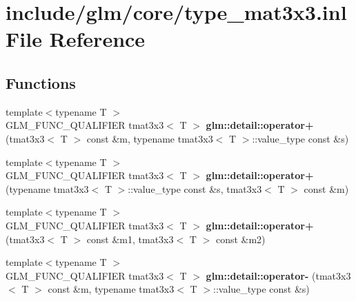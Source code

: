 \hypertarget{type__mat3x3_8inl}{\section{include/glm/core/type\-\_\-mat3x3.inl \-File \-Reference}
\label{type__mat3x3_8inl}
}
\subsection*{\-Functions}
\begin{DoxyCompactItemize}
\item 
\hypertarget{namespaceglm_1_1detail_a57257ebf7c5a307ceccf0712faed4b4f}{{\footnotesize template$<$typename T $>$ }\\\-G\-L\-M\-\_\-\-F\-U\-N\-C\-\_\-\-Q\-U\-A\-L\-I\-F\-I\-E\-R tmat3x3$<$ \-T $>$ {\bfseries glm\-::detail\-::operator+} (tmat3x3$<$ \-T $>$ const \&m, typename tmat3x3$<$ \-T $>$\-::value\-\_\-type const \&s)}\label{namespaceglm_1_1detail_a57257ebf7c5a307ceccf0712faed4b4f}

\item 
\hypertarget{namespaceglm_1_1detail_ac6c596ee3a5aa2947daba1472261f2ec}{{\footnotesize template$<$typename T $>$ }\\\-G\-L\-M\-\_\-\-F\-U\-N\-C\-\_\-\-Q\-U\-A\-L\-I\-F\-I\-E\-R tmat3x3$<$ \-T $>$ {\bfseries glm\-::detail\-::operator+} (typename tmat3x3$<$ \-T $>$\-::value\-\_\-type const \&s, tmat3x3$<$ \-T $>$ const \&m)}\label{namespaceglm_1_1detail_ac6c596ee3a5aa2947daba1472261f2ec}

\item 
\hypertarget{namespaceglm_1_1detail_ac854a7cbeb0bf0cb6ceabcde6c3631fb}{{\footnotesize template$<$typename T $>$ }\\\-G\-L\-M\-\_\-\-F\-U\-N\-C\-\_\-\-Q\-U\-A\-L\-I\-F\-I\-E\-R tmat3x3$<$ \-T $>$ {\bfseries glm\-::detail\-::operator+} (tmat3x3$<$ \-T $>$ const \&m1, tmat3x3$<$ \-T $>$ const \&m2)}\label{namespaceglm_1_1detail_ac854a7cbeb0bf0cb6ceabcde6c3631fb}

\item 
\hypertarget{namespaceglm_1_1detail_a98d0dc0519f2e0c7f7c25ac1644d9b37}{{\footnotesize template$<$typename T $>$ }\\\-G\-L\-M\-\_\-\-F\-U\-N\-C\-\_\-\-Q\-U\-A\-L\-I\-F\-I\-E\-R tmat3x3$<$ \-T $>$ {\bfseries glm\-::detail\-::operator-\/} (tmat3x3$<$ \-T $>$ const \&m, typename tmat3x3$<$ \-T $>$\-::value\-\_\-type const \&s)}\label{namespaceglm_1_1detail_a98d0dc0519f2e0c7f7c25ac1644d9b37}


\end{DoxyCompactItemize}
